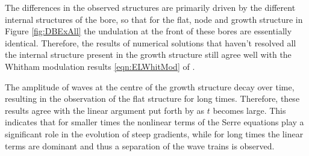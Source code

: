 The differences in the observed structures are primarily driven by the different internal structures of the bore, so that for the flat, node and growth structure in Figure \ref{fig:DBExAll} the undulation at the front of these bores are essentially identical. Therefore, the results of numerical solutions that haven't resolved all the internal structure present in the growth structure still agree well with the Whitham modulation results \eqref{eqn:ELWhitMod} of \citet{El-etal-2006}.

The amplitude of waves at the centre of the growth structure decay over time, resulting in the observation of the flat structure for long times. Therefore, these results agree with the linear argument put forth by \citet{Dougalis-etal-2007} as $t$ becomes large. This indicates that for smaller times the nonlinear terms of the Serre equations play a significant role in the evolution of steep gradients, while for long times the linear terms are dominant and thus a separation of the wave trains is observed. 

